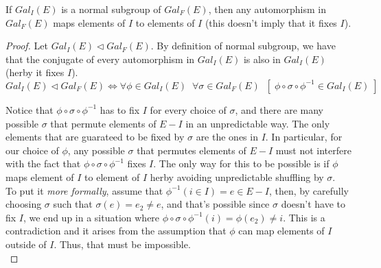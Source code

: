 \begin{lemma}
    \label{lem:normalSubgroupClosedMapping}
    If $Gal_{I}(E)$ is a normal subgroup of $Gal_{F}(E)$, then any automorphism in $Gal_{F}(E)$
    maps elements of $I$ to elements of $I$ (this doesn't imply that it fixes $I$).
\end{lemma}
\begin{proof}
    Let $Gal_{I}(E) \triangleleft Gal_{F}(E)$. By definition of normal subgroup, we have that the 
    conjugate of every automorphism in $Gal_{I}(E)$ is also in $Gal_{I}(E)$ (herby it fixes $I$). \\

    $$ Gal_{I}(E) \triangleleft Gal_{F}(E) \iff \forall \phi \in Gal_{I}(E)\;\; 
        \forall \sigma \in Gal_{F}(E)\;\; [\;\phi \circ \sigma \circ \phi^{-1} \in Gal_{I}(E) \;] $$
        \vspace{0.2em}
    
    Notice that $\phi \circ \sigma \circ \phi^{-1}$ has to fix $I$ for every choice of $\sigma$, 
    and there are many possible $\sigma$ that permute elements of $E - I$ in an unpredictable 
    way. The only elements that are guarateed to be fixed by $\sigma$ are the ones in $I$. In 
    particular, for our choice of $\phi$, any possible $\sigma$ that permutes elements of $E - I$ 
    must not interfere with the fact that $\phi \circ \sigma \circ \phi^{-1}$ fixes $I$. The only 
    way for this to be possible is if $\phi$ maps element of $I$ to element of $I$ herby avoiding 
    unpredictable shuffling by $\sigma$. \\
    
    To put it \emph{more formally}, assume that 
    $\phi^{-1}(i \in I) = e \in E - I$, then, by carefully choosing $\sigma$ such 
    that $\sigma(e) = e_2 \neq e$, and that's possible since $\sigma$ doesn't have to fix $I$, we
    end up in a situation where $\phi \circ \sigma \circ \phi^{-1}(i) = \phi(e_2) \neq i$. This 
    is a contradiction and it arises from the assumption that $\phi$ can map elements of 
    $I$ outside of $I$. Thus, that must be impossible. \\
\end{proof}

